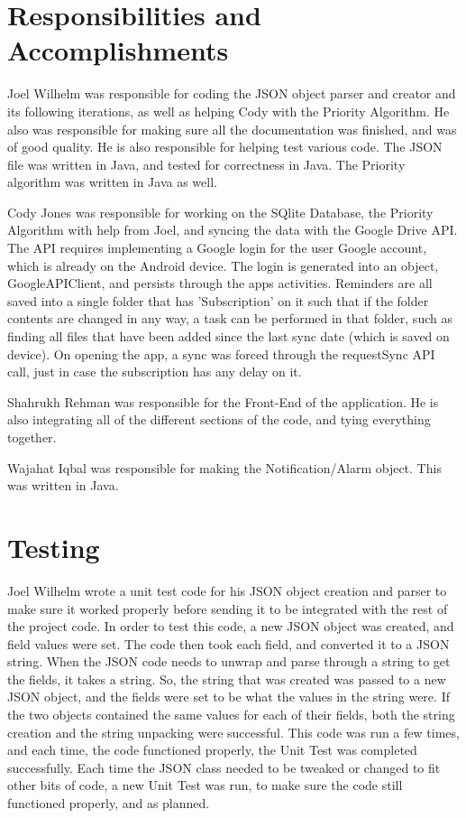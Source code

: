\documentclass[12pt]{article}
\begin{document}
\section{Responsibilities and Accomplishments}
Joel Wilhelm was responsible for coding the JSON object parser and creator and its following iterations, as well as helping Cody with the Priority Algorithm. He also was responsible for making sure all the documentation was finished, and was of good quality. He is also responsible for helping test various code. The JSON file was written in Java, and tested for correctness in Java. The Priority algorithm was written in Java as well.

Cody Jones was responsible for working on the SQlite Database, the Priority Algorithm with help from Joel, and syncing the data with the Google Drive API. The API requires implementing a Google login for the user Google account, which is already on the Android device. The login is generated into an object, GoogleAPIClient, and persists through the apps activities. Reminders are all saved into a single folder that has 'Subscription' on it such that if the folder contents are changed in any way, a task can be performed in that folder, such as finding all files that have been added since the last sync date (which is saved on device). On opening the app, a sync was forced through the requestSync API call, just in case the subscription has any delay on it.

Shahrukh Rehman was responsible for the Front-End of the application. He is also integrating all of the different sections of the code, and tying everything together.

Wajahat Iqbal was responsible for making the Notification/Alarm object. This was written in Java.

\section{Testing}

Joel Wilhelm wrote a unit test code for his JSON object creation and parser to make sure it worked properly before sending it to be integrated with the rest of the project code. In order to test this code, a new JSON object was created, and field values were set. The code then took each field, and converted it to a JSON string. When the JSON code needs to unwrap and parse through a string to get the fields, it takes a string. So, the string that was created was passed to a new JSON object, and the fields were set to be what the values in the string were. If the two objects contained the same values for each of their fields, both the string creation and the string unpacking were successful. This code was run a few times, and each time, the code functioned properly, the Unit Test was completed successfully. Each time the JSON class needed to be tweaked or changed to fit other bits of code, a new Unit Test was run, to make sure the code still functioned properly, and as planned.
\end{document}
